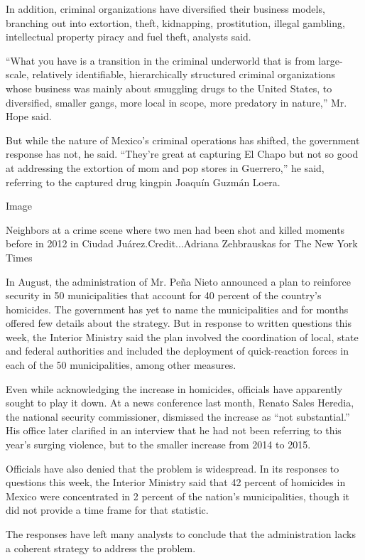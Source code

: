 In addition, criminal organizations have diversified their business
models, branching out into extortion, theft, kidnapping, prostitution,
illegal gambling, intellectual property piracy and fuel theft, analysts
said.

``What you have is a transition in the criminal underworld that is from
large-scale, relatively identifiable, hierarchically structured criminal
organizations whose business was mainly about smuggling drugs to the
United States, to diversified, smaller gangs, more local in scope, more
predatory in nature,'' Mr. Hope said.

But while the nature of Mexico's criminal operations has shifted, the
government response has not, he said. ``They're great at capturing El
Chapo but not so good at addressing the extortion of mom and pop stores
in Guerrero,'' he said, referring to the captured drug kingpin Joaquín
Guzmán Loera.

Image

Neighbors at a crime scene where two men had been shot and killed
moments before in 2012 in Ciudad Juárez.Credit...Adriana Zehbrauskas for
The New York Times

In August, the administration of Mr. Peña Nieto announced a plan to
reinforce security in 50 municipalities that account for 40 percent of
the country's homicides. The government has yet to name the
municipalities and for months offered few details about the strategy.
But in response to written questions this week, the Interior Ministry
said the plan involved the coordination of local, state and federal
authorities and included the deployment of quick-reaction forces in each
of the 50 municipalities, among other measures.

Even while acknowledging the increase in homicides, officials have
apparently sought to play it down. At a news conference last month,
Renato Sales Heredia, the national security commissioner, dismissed the
increase as ``not substantial.'' His office later clarified in an
interview that he had not been referring to this year's surging
violence, but to the smaller increase from 2014 to 2015.

Officials have also denied that the problem is widespread. In its
responses to questions this week, the Interior Ministry said that 42
percent of homicides in Mexico were concentrated in 2 percent of the
nation's municipalities, though it did not provide a time frame for that
statistic.

The responses have left many analysts to conclude that the
administration lacks a coherent strategy to address the problem.

